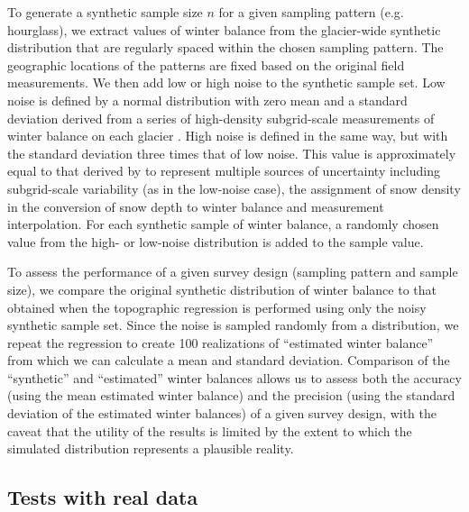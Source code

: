 \documentclass[twocolumn,letterpaper]{igs}
\begin{document}
To generate a synthetic sample size $n$ for a given sampling pattern (e.g. hourglass), we extract values of winter balance from the glacier-wide synthetic distribution 
that are regularly spaced within the chosen sampling pattern. The geographic locations of the patterns are fixed based on the original field measurements.    
We then add low or high noise to the synthetic sample set. Low noise is defined by a normal distribution with zero mean and a standard deviation derived from a series of high-density subgrid-scale measurements of winter balance on each glacier \citep{Pulwicki2017}.  
High noise is defined in the same way, but with the standard deviation three times that of low noise. This value is approximately equal to that derived by \citet{Pulwicki2017} to represent multiple sources of uncertainty including subgrid-scale variability (as in the low-noise case), the assignment of snow density in the conversion of snow depth to winter balance and measurement interpolation.
For each synthetic sample of winter balance, a randomly chosen value from the high- or low-noise distribution is added to the sample value.

To assess the performance of a given survey design (sampling pattern and sample size), we compare the original synthetic distribution of winter balance to that obtained when the topographic regression is performed using only the noisy synthetic sample set. 
Since the noise is sampled randomly from a distribution, we repeat the regression to create 100 realizations of ``estimated winter balance'' from which we can calculate a mean and standard deviation. Comparison of the ``synthetic'' and ``estimated'' winter balances allows us to assess both the accuracy (using the mean estimated winter balance) and the precision (using the standard deviation of the estimated winter balances) 
of a given survey design, with the caveat that the utility of the results is limited by the extent to which the simulated distribution represents a plausible reality.   
 
 \subsection{Tests with real data}
 
\end{document}

